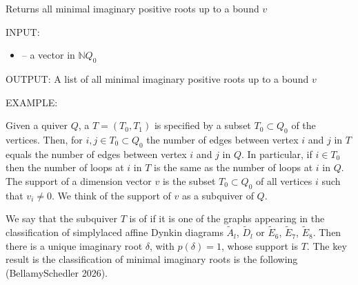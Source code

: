 \documentclass[letterpaper,10pt,english]{sphinxmanual}
\begin{document}
\begin{fulllineitems}
\label{\detokenize{index:quivercombinatorics.quivercombinatorics.Quiver.all_minimal_imaginary_positive_roots}}
\pysigstartsignatures
\pysiglinewithargsret
{}
{}
{}
\pysigstopsignatures
\sphinxAtStartPar
Returns all minimal imaginary positive roots up to a bound \(v\)

\sphinxAtStartPar
INPUT:
\begin{itemize}
\item {} 
\sphinxAtStartPar
{} – a vector in \(\mathbb{N}Q_0\)

\end{itemize}

\sphinxAtStartPar
OUTPUT: A list of all minimal imaginary positive roots up to a bound \(v\)

\sphinxAtStartPar
EXAMPLE:

\begin{sphinxVerbatim}[commandchars=\\\{\}]
  
   
 
\PYG{p}{[}\PYG{p}{]}
\end{sphinxVerbatim}

\end{fulllineitems}


\sphinxAtStartPar
Given a quiver \(Q\), a  \(T = (T_0, T_1)\) is specified by a subset \(T_0\subset Q_0\) of the vertices. Then, for \(i, j \in T_0 \subset Q_0\) the number of edges between vertex \(i\) and \(j\) in \(T\) equals the number of edges between vertex \(i\) and \(j\) in \(Q\). In particular, if \(i\in T_0\) then the number of loops at \(i\) in \(T\) is the same as the number of loops at \(i\) in \(Q\). The support of a dimension vector \(v\) is the subset \(T_0 \subset Q_0\) of all vertices \(i\) such that \(v_i\neq 0\). We think of the support of \(v\) as a subquiver of \(Q\).

\sphinxAtStartPar
We say that the subquiver \(T\) is of  if it is one of the graphs appearing in the classification of simply\sphinxhyphen{}laced affine Dynkin diagrams \(\tilde{A}_l\), \(\tilde{D}_l\) or \(\tilde{E}_6\), \(\tilde{E}_7\), \(\tilde{E}_8\). Then there is a unique imaginary root \(\delta\), with \(p(\delta)=1\), whose support is \(T\). The key result is the classification of minimal imaginary roots is the following (Bellamy\sphinxhyphen{}Schedler 2026).
\end{document}
